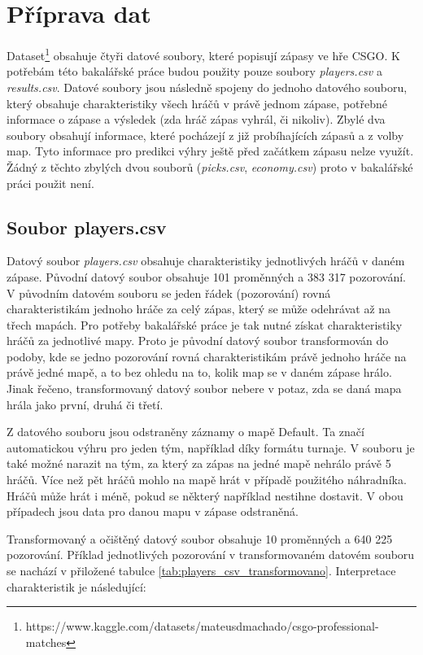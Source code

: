 \section{Příprava dat}
Dataset\footnote{https://www.kaggle.com/datasets/mateusdmachado/csgo-professional-matches} obsahuje čtyři datové soubory, které popisují zápasy ve hře
\ac{CSGO}. K potřebám této bakalářské práce budou použity pouze soubory \textit{players.csv} a \textit{results.csv}. Datové soubory jsou následně spojeny do jednoho datového
souboru, který obsahuje charakteristiky všech hráčů v právě jednom zápase, potřebné informace o zápase a výsledek (zda hráč zápas vyhrál, či nikoliv). Zbylé dva soubory obsahují
informace, které pocházejí z již probíhajících zápasů a z volby map. Tyto informace pro predikci výhry ještě před začátkem zápasu nelze využít. Žádný z těchto
zbylých dvou souborů (\textit{picks.csv}, \textit{economy.csv}) proto v bakalářské práci použit není.

\subsection{Soubor players.csv}
Datový soubor \textit{players.csv} obsahuje charakteristiky jednotlivých hráčů v daném zápase. Původní datový soubor obsahuje 101 proměnných a 383 317 pozorování.
V původním datovém souboru se jeden řádek (pozorování) rovná charakteristikám jednoho hráče za celý zápas, který se může odehrávat až na třech mapách.
Pro potřeby bakalářské práce je tak nutné získat charakteristiky hráčů za jednotlivé mapy. Proto je původní datový soubor transformován do podoby, kde se
jedno pozorování rovná charakteristikám právě jednoho hráče na právě jedné mapě, a to bez ohledu na to, kolik map se v daném zápase hrálo. Jinak řečeno, transformovaný
datový soubor nebere v potaz, zda se daná mapa hrála jako první, druhá či třetí.

Z datového souboru jsou odstraněny záznamy o mapě Default. Ta značí automatickou výhru pro jeden tým, například díky formátu turnaje. V souboru je také možné narazit na tým,
za který za zápas na jedné mapě nehrálo právě 5 hráčů. Více než pět hráčů mohlo na mapě hrát v případě použitého náhradníka. 
Hráčů může hrát i méně, pokud se některý například nestihne dostavit. V obou případech jsou data pro danou mapu v zápase odstraněná.

Transformovaný a očištěný datový soubor obsahuje 10 proměnných a 640 225 pozorování. Příklad jednotlivých pozorování v transformovaném datovém souboru se nachází v
přiložené tabulce \ref{tab:players_csv_transformovano}. Interpretace charakteristik je následující:

